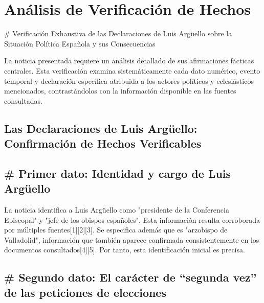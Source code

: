 \documentclass[10pt,a4paper]{article}
\begin{document}

\section*{Análisis de Verificación de Hechos}
    \# Verificaci\'{o}n Exhaustiva de las Declaraciones de Luis Arg\"{u}ello sobre la Situaci\'{o}n Pol\'{i}tica Espa\~{n}ola y sus Consecuencias
\par\medskip
La noticia presentada requiere un an\'{a}lisis detallado de sus afirmaciones f\'{a}cticas centrales. Esta verificaci\'{o}n examina sistem\'{a}ticamente cada dato num\'{e}rico, evento temporal y declaraci\'{o}n espec\'{i}fica atribuida a los actores pol\'{i}ticos y eclesi\'{a}sticos mencionados, contrast\'{a}ndolos con la informaci\'{o}n disponible en las fuentes consultadas. 

\subsection*{Las Declaraciones de Luis Arg\"{u}ello: Confirmaci\'{o}n de Hechos Verificables}



\subsection*{\# Primer dato: Identidad y cargo de Luis Arg\"{u}ello}

 La noticia identifica a Luis Arg\"{u}ello como "presidente de la Conferencia Episcopal" y "jefe de los obispos espa\~{n}oles". Esta informaci\'{o}n resulta corroborada por m\'{u}ltiples fuentes[1][2][3]. Se especifica adem\'{a}s que es "arzobispo de Valladolid", informaci\'{o}n que tambi\'{e}n aparece confirmada consistentemente en los documentos consultados[4][5]. Por tanto, esta identificaci\'{o}n inicial es precisa. 

\subsection*{\# Segundo dato: El car\'{a}cter de ``segunda vez'' de las peticiones de elecciones}
\end{document}

